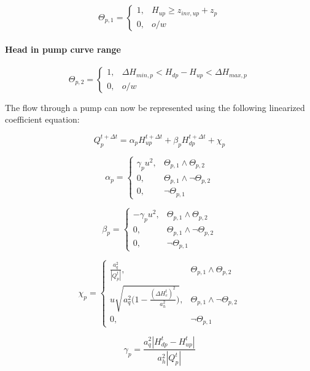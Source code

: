 \documentclass[11pt]{article}
\begin{document}
\begin{equation}
  \Theta_{p,1} =
  \begin{cases}
    1, & H_{up} \geq z_{inv,up} + z_p  \\
    0, & o/w
  \end{cases}
\end{equation}

\paragraph{Head in pump curve range}

\begin{equation}
  \Theta_{p,2} =
  \begin{cases}
    1, & \Delta H_{min,p} < H_{dp} - H_{up} < \Delta H_{max,p} \\
    0, & o/w
  \end{cases}
\end{equation}

The flow through a pump can now be represented using the following linearized
coefficient equation:

\begin{equation}
 Q_{p}^{t + \Delta t} = \alpha_{p} H_{up}^{t + \Delta t} + \beta_{p} H_{dp}^{t + \Delta t} + \chi_{p} 
\end{equation}

\begin{equation}
  \alpha_{p} =
  \begin{cases}
   \gamma_p u^2, & \Theta_{p,1} \land \Theta_{p,2}\\
   0, & \Theta_{p,1} \land \lnot \Theta_{p,2}\\
   0, & \lnot \Theta_{p,1}
  \end{cases}
\end{equation}

\begin{equation}
  \beta_{p} =
  \begin{cases}
   -\gamma_p u^2, & \Theta_{p,1} \land \Theta_{p,2}\\
   0, & \Theta_{p,1} \land \lnot \Theta_{p,2}\\
   0, & \lnot \Theta_{p,1}
  \end{cases}
\end{equation}

\begin{equation}
  \chi_{p} =
  \begin{cases}
   \frac{a_q^2}{|Q_p^t|}, & \Theta_{p,1} \land \Theta_{p,2}\\
   u \sqrt{a_q^2 \bigl( 1 - \frac{(\Delta H_{e}^t)^2}{a_h^2} \bigr)}, & \Theta_{p,1} \land \lnot \Theta_{p,2}\\
   0, & \lnot \Theta_{p,1}
  \end{cases}
\end{equation}

\begin{equation}
 \gamma_p = \frac{a_q^2 |H_{dp}^t - H_{up}^t|}{a_h^2 |Q_{p}^t|}
\end{equation}
\end{document}
